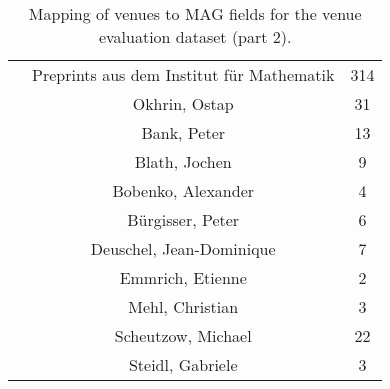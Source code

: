 \begin{table}
\begin{tabular}{|c|c|c|}
& Preprints aus dem Institut für Mathematik & 314 \\ \cline{2-3}
& Okhrin, Ostap & 31 \\ \cline{2-3}
& Bank, Peter & 13 \\ \cline{2-3}
& Blath, Jochen & 9 \\ \cline{2-3}
& Bobenko, Alexander & 4 \\ \cline{2-3}
& Bürgisser, Peter & 6 \\ \cline{2-3}
& Deuschel, Jean-Dominique & 7 \\ \cline{2-3}
& Emmrich, Etienne & 2 \\ \cline{2-3}
& Mehl, Christian & 3 \\ \cline{2-3}
& Scheutzow, Michael & 22 \\ \cline{2-3}
& Steidl, Gabriele & 3 \\ \cline{2-3}
\hline
\end{tabular}
\caption{Mapping of venues to MAG fields for the venue evaluation dataset (part 2).}
\label{tab:venue_field_map_2}
\end{table}

